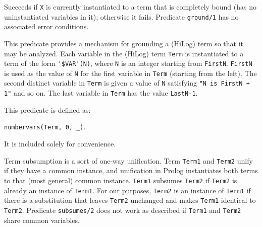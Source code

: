 \begin{description}
    Succeeds if {\tt X} is currently instantiated to a term that is 
    completely bound (has no uninstantiated variables in it); 
    otherwise it fails.  Predicate {\tt ground/1} has no associated 
    error conditions.

    This predicate provides a mechanism for grounding a (HiLog) term
    so that it may be analyzed.  Each variable in the (HiLog) term
    {\tt Term} is instantiated to a term of the form \verb|'$VAR'(N)|,
    where {\tt N} is an integer starting from {\tt FirstN}.  
    {\tt FirstN} is used as the value of {\tt N} for the first
    variable in {\tt Term} (starting from the left). The second distinct
    variable in {\tt Term} is given a value of {\tt N} satisfying
    {\tt "N is FirstN + 1"} and so on.  The last variable in {\tt Term}
    has the value {\tt LastN-1}.

    This predicate is defined as:
    \begin{center}
    {\tt   numbervars(Term, 0, \_)}.
    \end{center}
    It is included solely for convenience.


    Term subsumption is a sort of one-way unification.  Term {\tt Term1}
    and {\tt Term2} unify if they have a common instance, and unification
    in Prolog instantiates both terms to that (most general) common instance.
    {\tt Term1} subsumes {\tt Term2} if {\tt Term2} is already an instance of
    {\tt Term1}.  For our purposes, {\tt Term2} is an instance of {\tt Term1}
    if there is a substitution that leaves {\tt Term2} unchanged and makes
    {\tt Term1} identical to {\tt Term2}.  Predicate {\tt subsumes/2} does
    not work as described if {\tt Term1} and {\tt Term2} share common
    variables.


\end{description}
